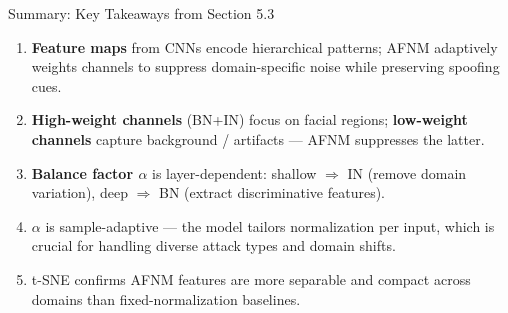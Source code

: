\documentclass[aspectratio=169,10pt]{beamer}
\newcommand{\pos}[1]{\textcolor{positive}{#1}}
\newcommand{\HL}[1]{\textcolor{emphasis}{#1}}
\begin{document}
\begin{frame}{Summary: Key Takeaways from Section 5.3}
  \begin{enumerate}
    \item \textbf{Feature maps} from CNNs encode hierarchical patterns; AFNM adaptively weights channels to suppress domain-specific noise while preserving spoofing cues.

    \item \textbf{High-weight channels} (BN+IN) focus on facial regions; \textbf{low-weight channels} capture background / artifacts — AFNM suppresses the latter.

    \item \textbf{Balance factor $\alpha$} is layer-dependent:
          \pos{shallow $\Rightarrow$ IN} (remove domain variation),
          \pos{deep $\Rightarrow$ BN} (extract discriminative features).

    \item $\alpha$ is \HL{sample-adaptive} — the model tailors normalization per input, which is crucial for handling diverse attack types and domain shifts.

    \item t-SNE confirms AFNM features are \HL{more separable and compact} across domains than fixed-normalization baselines.
  \end{enumerate}

  \vspace{8pt}
  \begin{center}
  \end{center}
\end{frame}
\end{document}
